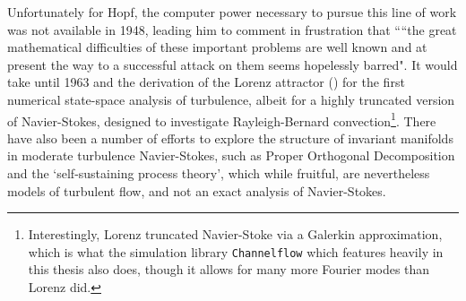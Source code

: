 Unfortunately for Hopf, the computer power necessary to pursue this line of work was not available in 1948, leading him to comment in frustration that ``“the great mathematical difficulties of these important problems are well
known and at present the way to a successful attack on them seems hopelessly
barred". It would take until 1963 and the derivation of the Lorenz attractor () for the first numerical state-space analysis of turbulence, albeit for a highly truncated version of Navier-Stokes, designed to investigate Rayleigh-Bernard convection\footnote{Interestingly, Lorenz truncated Navier-Stoke via a Galerkin approximation, which is what the simulation library {\tt Channelflow} which features heavily in this thesis also does, though it allows for many more Fourier modes than Lorenz did.}. There have also been a number of efforts to explore the structure of invariant manifolds in moderate turbulence Navier-Stokes, such as Proper Orthogonal Decomposition and the `self-sustaining process theory', which while fruitful, are nevertheless models of turbulent flow, and not an exact analysis of Navier-Stokes.\\


